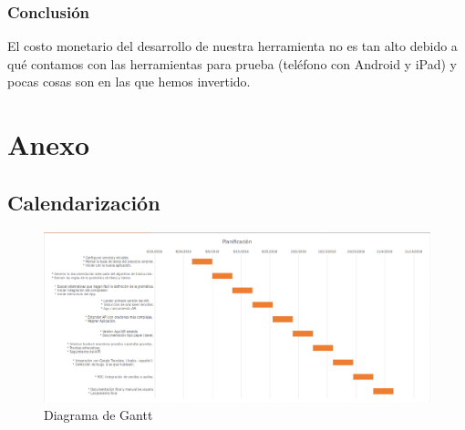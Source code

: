 \documentclass[a4paper,openright,12pt]{article}
\begin{document}
\subsubsection{Conclusión}
El costo monetario del desarrollo de nuestra herramienta no es tan alto debido a qué contamos con las herramientas para prueba (teléfono con Android y iPad) y pocas cosas son en las que hemos invertido.
\newpage

\section{Anexo}
\subsection{Calendarización}
\begin{figure}[h]
  \centering
    \includegraphics[width=1.0\textwidth]{Gantt}
  \caption{Diagrama de Gantt}
  \label{fig:gantt}
\end{figure}

\newpage
\end{document}
